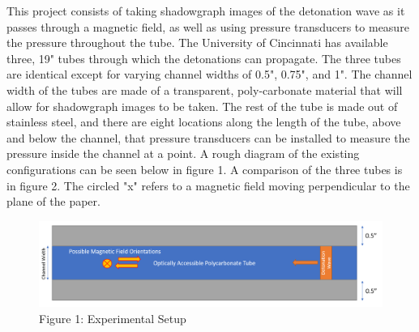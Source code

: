 \documentclass[preview,12pt]{article}
\begin{document}
\indent This project consists of taking shadowgraph images of the detonation wave as it passes through a magnetic field, as well as using pressure transducers to measure the pressure throughout the tube.  The University of Cincinnati has available three, 19" tubes through which the detonations can propagate.  The three tubes are identical except for varying channel widths of 0.5", 0.75", and 1".  The channel width of the tubes are made of a transparent, poly-carbonate material that will allow for shadowgraph images to be taken.  The rest of the tube is made out of stainless steel, and there are eight locations along the length of the tube, above and below the channel, that pressure transducers can be installed to measure the pressure inside the channel at a point.  A rough diagram of the existing configurations can be seen below in figure 1.  A comparison of the three tubes is in figure 2.  The circled "x" refers to a magnetic field moving perpendicular to the plane of the paper. 
$$$$
\begin{figure}[h]
    \begin{center}
        \includegraphics[width=\textwidth]{DetTube.PNG}
        Figure 1: Experimental Setup
    \end{center}
\end{figure}
$$$$
\end{document}
